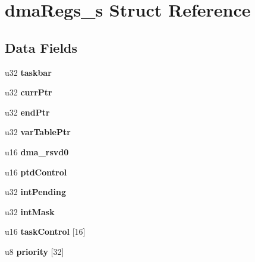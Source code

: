 \hypertarget{structdmaRegs__s}{}\section{dma\+Regs\+\_\+s Struct Reference}
\label{structdmaRegs__s}
\subsection*{Data Fields}
\begin{DoxyCompactItemize}
\item 
\mbox{\label{structdmaRegs__s_a52768467ee4f55e9e5aef613c524b92c}} 
u32 {\bfseries taskbar}
\item 
\mbox{\label{structdmaRegs__s_aecb550633a05d77e51d537bd17efc9f2}} 
u32 {\bfseries curr\+Ptr}
\item 
\mbox{\label{structdmaRegs__s_a79156c229d3e1ea92d60179ac6e8adec}} 
u32 {\bfseries end\+Ptr}
\item 
\mbox{\label{structdmaRegs__s_a1dc776e3c4c22f2c25dba5c659e185fe}} 
u32 {\bfseries var\+Table\+Ptr}
\item 
\mbox{\label{structdmaRegs__s_a23dbe8a2e84fd5fd208604a24f7fb8c8}} 
u16 {\bfseries dma\+\_\+rsvd0}
\item 
\mbox{\label{structdmaRegs__s_a98e6bed4173af9552a369b4fda98544f}} 
u16 {\bfseries ptd\+Control}
\item 
\mbox{\label{structdmaRegs__s_a6fdf04fe73610e7c61b0c3bc59ba6e08}} 
u32 {\bfseries int\+Pending}
\item 
\mbox{\label{structdmaRegs__s_a04a00d1c54ba9f81c8231d0fdfd3bbef}} 
u32 {\bfseries int\+Mask}
\item 
\mbox{\label{structdmaRegs__s_a0c5668357de0536572a97adfbdf99a7f}} 
u16 {\bfseries task\+Control} \mbox{[}16\mbox{]}
\item 
\mbox{\label{structdmaRegs__s_a9b90483ce61ad4d514a367df6757a989}} 
u8 {\bfseries priority} \mbox{[}32\mbox{]}

\end{DoxyCompactItemize}
